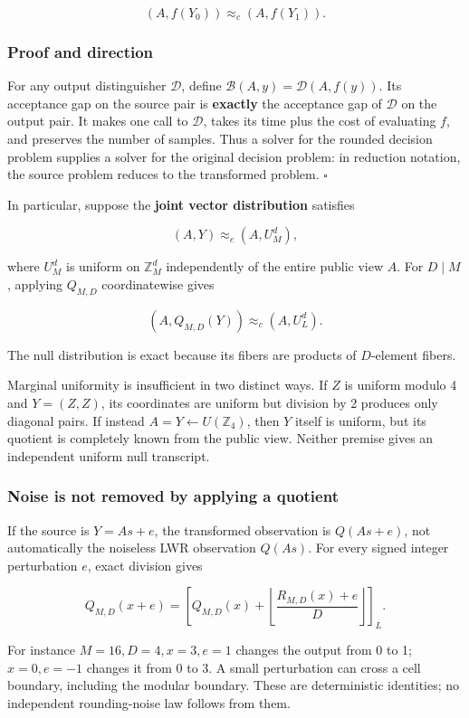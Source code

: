 \documentclass[11pt,a4paper]{article}
\begin{document}
\[
(A,f(Y_0))\approx_c(A,f(Y_1)).
\]

\subsubsection{Proof and direction}\label{proof-and-direction}

For any output distinguisher \(\mathcal D\), define \(\mathcal B(A,y)=\mathcal D(A,f(y))\). Its acceptance gap on the source pair is \textbf{exactly} the acceptance gap of \(\mathcal D\) on the output pair. It makes one call to \(\mathcal D\), takes its time plus the cost of evaluating \(f\), and preserves the number of samples. Thus a solver for the rounded decision problem supplies a solver for the original decision problem: in reduction notation, the source problem reduces to the transformed problem. \(\square\)

In particular, suppose the \textbf{joint vector distribution} satisfies

\[
(A,Y)\approx_c(A,U_M^d),
\]

where \(U_M^d\) is uniform on \(\mathbb Z_M^d\) independently of the entire public view \(A\). For \(D\mid M\), applying \(Q_{M,D}\) coordinatewise gives

\[
(A,Q_{M,D}(Y))\approx_c(A,U_L^d).
\]

The null distribution is exact because its fibers are products of \(D\)-element fibers.

Marginal uniformity is insufficient in two distinct ways. If \(Z\) is uniform modulo 4 and \(Y=(Z,Z)\), its coordinates are uniform but division by 2 produces only diagonal pairs. If instead \(A=Y\leftarrow U(\mathbb Z_4)\), then \(Y\) itself is uniform, but its quotient is completely known from the public view. Neither premise gives an independent uniform null transcript.

\subsubsection{Noise is not removed by applying a quotient}\label{noise-is-not-removed-by-applying-a-quotient}

If the source is \(Y=As+e\), the transformed observation is \(Q(As+e)\), not automatically the noiseless LWR observation \(Q(As)\). For every signed integer perturbation \(e\), exact division gives

\[
Q_{M,D}(x+e)
=\left[Q_{M,D}(x)+\left\lfloor\frac{R_{M,D}(x)+e}{D}\right\rfloor\right]_L.
\]

For instance \(M=16,D=4,x=3,e=1\) changes the output from 0 to 1; \(x=0,e=-1\) changes it from 0 to 3. A small perturbation can cross a cell boundary, including the modular boundary. These are deterministic identities; no independent rounding-noise law follows from them.
\end{document}
